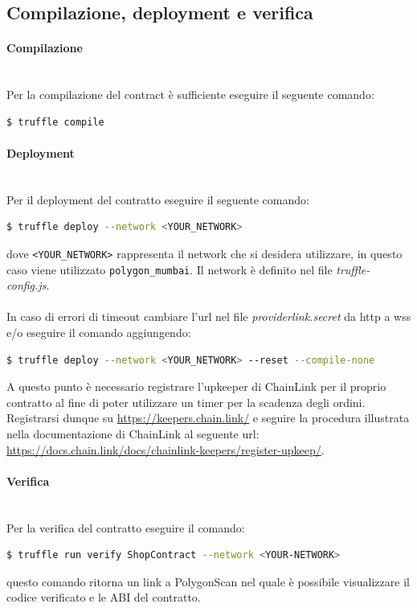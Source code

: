 \documentclass[a4paper, 12pt]{article}
\begin{document}
\subsection{Compilazione, deployment e verifica}
\paragraph{Compilazione}\\
Per la compilazione del contract è sufficiente eseguire il seguente comando:
\begin{lstlisting}[language=bash]
  $ truffle compile
\end{lstlisting}
\paragraph{Deployment}\\
Per il deployment del contratto eseguire il seguente comando:
\begin{lstlisting}[language=bash]
  $ truffle deploy --network <YOUR_NETWORK>
\end{lstlisting}
dove \verb|<YOUR_NETWORK>| rappresenta il network che si desidera utilizzare, in questo caso viene utilizzato \verb|polygon_mumbai|. Il network è definito nel file \textit{truffle-config.js}.\\ \\
In caso di errori di timeout cambiare l'url nel file \textit{providerlink.secret} da http a wss e/o eseguire il comando aggiungendo:
\begin{lstlisting}[language=bash]
  $ truffle deploy --network <YOUR_NETWORK> --reset --compile-none
\end{lstlisting}
A questo punto è necessario registrare l'upkeeper di ChainLink per il proprio contratto al fine di poter utilizzare un timer per la scadenza degli ordini. Registrarsi dunque su \url{https://keepers.chain.link/} e seguire la procedura illustrata nella documentazione di ChainLink al seguente url: \url{https://docs.chain.link/docs/chainlink-keepers/register-upkeep/}.
\paragraph{Verifica}\\
Per la verifica del contratto eseguire il comando:
\begin{lstlisting}[language=bash]
  $ truffle run verify ShopContract --network <YOUR-NETWORK>
\end{lstlisting}
questo comando ritorna un link a PolygonScan nel quale è possibile visualizzare il codice verificato e le ABI del contratto.
\end{document}
